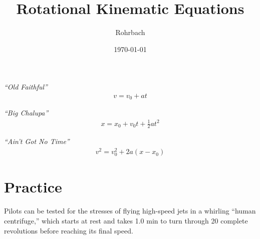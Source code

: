 \documentclass[10pt]{exam}
\title{Rotational Kinematic Equations}
\author{Rohrbach}
\date{\today}
\begin{document}
\maketitle


\begin{multicols}{3}
  \begin{center}
      \emph{``Old Faithful''} 
      \begin{align*}
        v = v_0 + a t
      \end{align*}

      \columnbreak
      
      \emph{``Big Chalupa''} 
      \begin{align*}
        x = x_0 + v_0t + \frac{1}{2}at^2
      \end{align*}

      \columnbreak
      
      \emph{``Ain't Got No Time''}
      \begin{align*}
        v^2 = v_0^2 + 2a \left( x - x_0 \right)
      \end{align*}

  \end{center}
\end{multicols}

\vspace{5em}

\section*{Practice}

Pilots can be tested for the stresses of flying high-speed jets in a whirling ``human centrifuge,'' which starts at rest and takes 1.0 min to turn through 20 complete revolutions before reaching its final speed.

\vspace{2em}

\end{document}
